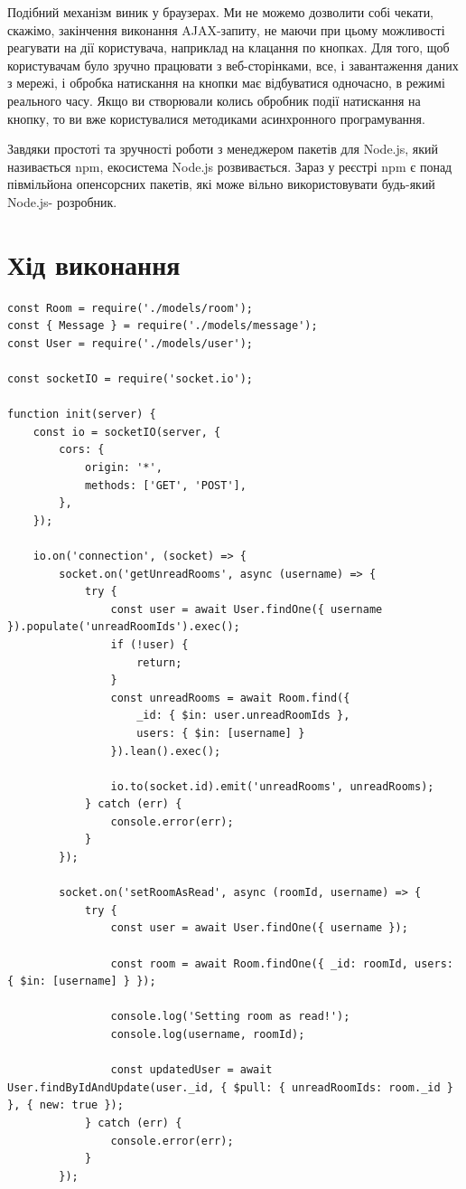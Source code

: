 \documentclass{article}
\begin{document}
\begin{normalsize}
Подібний механізм виник у браузерах. Ми не можемо дозволити собі чекати, скажімо,
закінчення виконання AJAX-запиту, не маючи при цьому можливості реагувати на дії
користувача, наприклад на клацання по кнопках. Для того, щоб користувачам було зручно
працювати з веб-сторінками, все, і завантаження даних з мережі, і обробка натискання на
кнопки має відбуватися одночасно, в режимі реального часу.
Якщо ви створювали колись обробник події натискання на кнопку, то ви вже
користувалися методиками асинхронного програмування.

Завдяки простоті та зручності роботи з менеджером пакетів для Node.js, який
називається npm, екосистема Node.js розвивається. Зараз у реєстрі npm є понад
півмільйона опенсорсних пакетів, які може вільно використовувати будь-який Node.js-
розробник.

\section*{Хід виконання}
\begin{lstlisting}
const Room = require('./models/room');
const { Message } = require('./models/message');
const User = require('./models/user');

const socketIO = require('socket.io');

function init(server) {
	const io = socketIO(server, {
		cors: {
			origin: '*',
			methods: ['GET', 'POST'],
		},
	});
	
	io.on('connection', (socket) => {
		socket.on('getUnreadRooms', async (username) => {
			try {
				const user = await User.findOne({ username }).populate('unreadRoomIds').exec();
				if (!user) {
					return;
				}
				const unreadRooms = await Room.find({
					_id: { $in: user.unreadRoomIds },
					users: { $in: [username] }
				}).lean().exec();
				
				io.to(socket.id).emit('unreadRooms', unreadRooms);
			} catch (err) {
				console.error(err);
			}
		});
		
		socket.on('setRoomAsRead', async (roomId, username) => {
			try {
				const user = await User.findOne({ username });
				
				const room = await Room.findOne({ _id: roomId, users: { $in: [username] } });
				
				console.log('Setting room as read!');
				console.log(username, roomId);
				
				const updatedUser = await User.findByIdAndUpdate(user._id, { $pull: { unreadRoomIds: room._id } }, { new: true });
			} catch (err) {
				console.error(err);
			}
		});
		

\end{lstlisting}
\end{normalsize}
\end{document}
